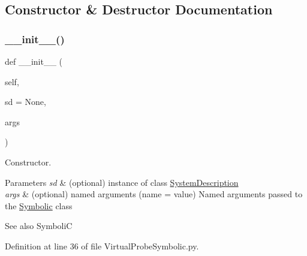 \subsection{Constructor \& Destructor Documentation}
\mbox{\label{classSignalIntegrity_1_1SystemDescriptions_1_1VirtualProbeSymbolic_1_1VirtualProbeSymbolic_a72fa31992e716f60779f561f6cdbb4ce}} 
\subsubsection{\texorpdfstring{\+\_\+\+\_\+init\+\_\+\+\_\+()}{\_\_init\_\_()}}
{\footnotesize\ttfamily def \+\_\+\+\_\+init\+\_\+\+\_\+ (\begin{DoxyParamCaption}\item[{}]{self,  }\item[{}]{sd = {\ttfamily None},  }\item[{}]{args }\end{DoxyParamCaption})}



Constructor. 


\begin{DoxyParams}{Parameters}
{\em sd} & (optional) instance of class \hyperlink{namespaceSignalIntegrity_1_1SystemDescriptions_1_1SystemDescription}{System\+Description} \\
\hline
{\em args} & (optional) named arguments (name = value) Named arguments passed to the \hyperlink{namespaceSignalIntegrity_1_1SystemDescriptions_1_1Symbolic}{Symbolic} class \\
\hline
\end{DoxyParams}
\begin{DoxySeeAlso}{See also}
SymboliC 
\end{DoxySeeAlso}


Definition at line 36 of file Virtual\+Probe\+Symbolic.\+py.



